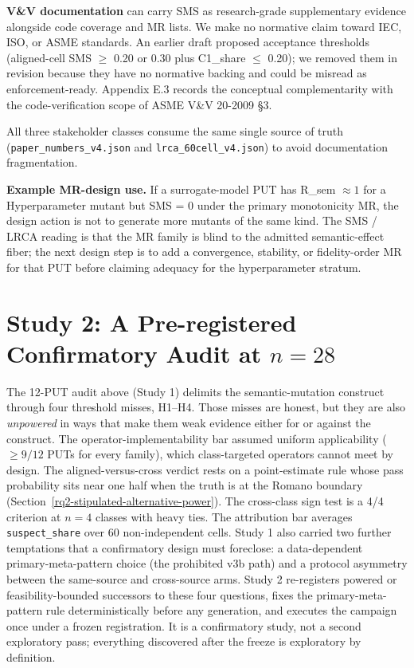 \documentclass[manuscript,screen,review]{acmart}
\begin{document}
\textbf{V\&V documentation} can carry SMS as research-grade
supplementary evidence alongside code coverage and MR lists. We make no
normative claim toward IEC, ISO, or ASME standards. An earlier draft
proposed acceptance thresholds (aligned-cell SMS $\geq$ 0.20 or 0.30 plus
C1\_share $\leq$ 0.20); we removed them in revision because they have no
normative backing and could be misread as enforcement-ready. Appendix
E.3 records the conceptual complementarity with the code-verification
scope of ASME V\&V 20-2009 §3.

All three stakeholder classes consume the same single source of truth
(\texttt{paper\_numbers\_v4.json} and \texttt{lrca\_60cell\_v4.json}) to
avoid documentation fragmentation.

\textbf{Example MR-design use.} If a surrogate-model PUT has
R\_sem $\approx 1$ for a Hyperparameter mutant but SMS = 0 under the
primary monotonicity MR, the design action is not to generate more
mutants of the same kind. The SMS / LRCA reading is that the MR family is
blind to the admitted semantic-effect fiber; the next design step is to
add a convergence, stability, or fidelity-order MR for that PUT before
claiming adequacy for the hyperparameter stratum.


\section{Study 2: A Pre-registered Confirmatory Audit at \texorpdfstring{$n = 28$}{n=28}}\label{study2-confirmatory-audit}

The 12-PUT audit above (Study 1) delimits the semantic-mutation construct
through four threshold misses, H1--H4. Those misses are honest, but they
are also \emph{unpowered} in ways that make them weak evidence either for
or against the construct. The operator-implementability bar assumed
uniform applicability (\(\geq 9/12\) PUTs for every family), which
class-targeted operators cannot meet by design. The aligned-versus-cross
verdict rests on a point-estimate rule whose pass probability sits near
one half when the truth is at the Romano boundary
(Section~\ref{rq2-stipulated-alternative-power}). The cross-class sign
test is a 4/4 criterion at \(n = 4\) classes with heavy ties. The
attribution bar averages \texttt{suspect\_share} over 60 non-independent
cells. Study 1 also carried two further temptations that a confirmatory
design must foreclose: a data-dependent primary-meta-pattern choice (the
prohibited v3b path) and a protocol asymmetry between the same-source and
cross-source arms. Study 2 re-registers powered or feasibility-bounded
successors to these four questions, fixes the primary-meta-pattern rule
deterministically before any generation, and executes the campaign once
under a frozen registration. It is a confirmatory study, not a second
exploratory pass; everything discovered after the freeze is exploratory
by definition.
\end{document}
